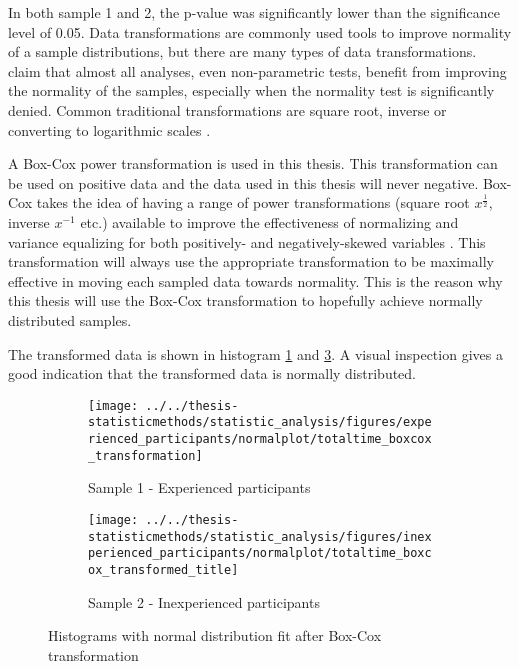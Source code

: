In both sample 1 and 2, the p-value was significantly lower than the significance level of 0.05. Data transformations are commonly used tools to improve normality of a sample distributions, but there are many types of data transformations. \cite{Osborne2010} claim that almost all analyses, even non-parametric tests, benefit from improving the normality of the samples, especially when the normality test is significantly denied. Common traditional transformations are square root, inverse or converting to logarithmic scales  \citep{Osborne2010}. 

A Box-Cox power transformation is used in this thesis. This transformation can be used on positive data and the data used in this thesis will never negative. Box-Cox takes the idea of having a range of power transformations (square root $x^{\frac{1}{2}}$, inverse $x^{-1}$ etc.) available to improve the effectiveness of normalizing and variance equalizing for both positively- and negatively-skewed variables \citep{Osborne2010}. This transformation will always use the appropriate transformation to be maximally effective in moving each sampled data towards normality. This is the reason why this thesis will use the Box-Cox transformation to hopefully achieve normally distributed samples.

The transformed data is shown in histogram \ref{fig:totaltimeboxcoxtransformation_experienced} and \ref{fig:totaltimeboxcoxtransformedtitle_inexperienced}. A visual inspection gives a good indication that the transformed data is normally distributed.

\begin{figure}[H]
	\centering
	\begin{subfigure}[b]{0.48\textwidth}
		\centering
		\texttt{[image: ../../thesis-statisticmethods/statistic\_analysis/figures/experienced\_participants/normalplot/totaltime\_boxcox\_transformation]}
		\caption[Experienced, Box-Cox]{Sample 1 - Experienced participants}
		\label{fig:totaltimeboxcoxtransformation_experienced}
	\end{subfigure}
	\begin{subfigure}[b]{0.48\textwidth}
		\centering
		\texttt{[image: ../../thesis-statisticmethods/statistic\_analysis/figures/inexperienced\_participants/normalplot/totaltime\_boxcox\_transformed\_title]}
		\caption[Inexperienced, Box-Cox]{Sample 2 - Inexperienced participants}
		\label{fig:totaltimeboxcoxtransformedtitle_inexperienced}
	\end{subfigure}
\caption{Histograms with normal distribution fit after Box-Cox transformation}
\end{figure}

